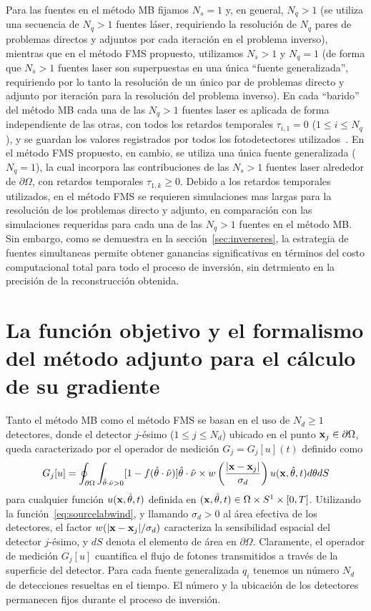 Para las fuentes en el método MB fijamos $N_s=1$ y, en general, $N_q>1$ 
(se utiliza una secuencia de $N_q>1$ fuentes láser, requiriendo la resolución de 
$N_q$ pares de problemas directos y adjuntos por cada iteración en el problema inverso), 
mientras que en el método FMS propuesto, utilizamos $N_s>1$ y $N_q=1$ (de forma 
que $N_s>1$ fuentes laser son superpuestas en una única ``fuente generalizada'', 
requiriendo por lo tanto la resolución de un único par de problemas directo y 
adjunto por iteración para la resolución del problema inverso). En cada ``barido''
del método MB cada una de las $N_q>1$ fuentes laser es aplicada de forma 
independiente de las otras, con todos los retardos temporales $\tau_{i,1}=0$ ($1\leq i\leq N_q$), y se guardan los valores registrados por todos los fotodetectores utilizados~\cite{Prieto2017,Dorn}. En el método FMS propuesto, en cambio, 
se utiliza una única fuente generalizada ($N_q=1$), la cual incorpora 
las contribuciones de las $N_s>1$ fuentes laser alrededor de $\partial \Omega$, 
con retardos temporales $\tau_{1,k}\geq 0$. Debido a los retardos temporales 
utilizados, en el método FMS se requieren simulaciones mas largas para la resolución de los problemas directo y adjunto, en comparación con las simulaciones requeridas 
para cada una de las $N_q>1$ fuentes en el método MB. Sin embargo, como se 
demuestra en la sección~\ref{sec:inverseres}, la estrategia de fuentes simultaneas 
permite obtener ganancias significativas en términos del costo computacional 
total para todo el proceso de inversión, sin detrmiento en la precisión de la 
reconstrucción obtenida. 

\section{La función objetivo y el formalismo del método adjunto para el cálculo de su gradiente}

Tanto el método MB como el método FMS se basan en el uso de  $N_d\geq 1$ detectores, 
donde el detector $j$-ésimo ($1\leq j\leq N_d$) ubicado en el punto 
$\mathbf{x}_j \in \partial \Omega$, queda caracterizado por el operador 
de medición $G_j=G_j[u](t)$ definido como 
\begin{equation}
  G_j[u]=\oint_{\partial \Omega}\int_{\hat{\theta} \cdot \hat{\nu}>0}[1-f(\hat{\theta}
  \cdot \hat{\nu})]
  \hat{\theta} \cdot \hat{\nu} 
  \times w\left( \frac{ |\mathbf{x}-\mathbf{x}_j |}{\sigma_d} \right) u(\mathbf{x},\hat{\theta},t)
  d\theta dS
\label{eq:OpMed}
\end{equation}
para cualquier función $u(\mathbf{x},\hat{\theta},t)$ definida en $(\mathbf{x},\hat{\theta},t)\in\Omega\times S^1 \times [0,T] $. 
Utilizando la función~\eqref{eq:sourcelabwind}, y llamando $\sigma_d>0$ 
al área efectiva de los detectores, el factor $w( |\mathbf{x}-\mathbf{x}_j |/\sigma_d) $ 
caracteriza la sensibilidad espacial del detector $j$-ésimo, 
y $dS$ denota el elemento de área en $\partial \Omega$. 
Claramente, el operador de medición $G_j[u]$ cuantifica el flujo de fotones 
transmitidos a través de la superficie del detector. Para cada 
fuente generalizada $q_i$ tenemos un número $N_d$ de detecciones 
resueltas en el tiempo. El número y la ubicación de los detectores 
permanecen fijos durante el proceso de inversión. 

